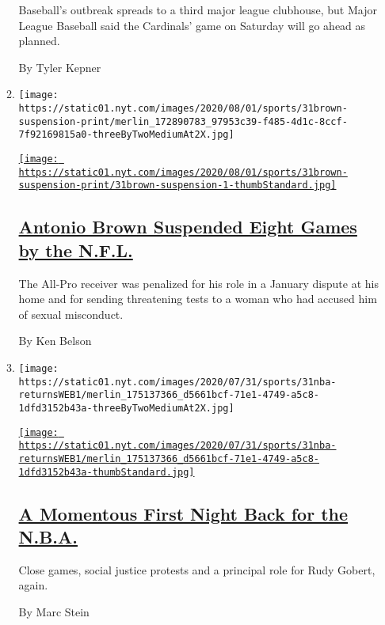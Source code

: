 \begin{enumerate}
\begin{enumerate}
    Baseball's outbreak spreads to a third major league clubhouse, but
    Major League Baseball said the Cardinals' game on Saturday will go
    ahead as planned.

    By Tyler Kepner
  \item
    \texttt{[image: https://static01.nyt.com/images/2020/08/01/sports/31brown-suspension-print/merlin\_172890783\_97953c39-f485-4d1c-8ccf-7f92169815a0-threeByTwoMediumAt2X.jpg]}

    \href{/2020/07/31/sports/football/antonio-brown-suspension-nfl.html}{\texttt{[image: https://static01.nyt.com/images/2020/08/01/sports/31brown-suspension-print/31brown-suspension-1-thumbStandard.jpg]}}

    \hypertarget{antonio-brown-suspended-eight-games-by-the-nfl}{%
    \subsection{\texorpdfstring{\href{/2020/07/31/sports/football/antonio-brown-suspension-nfl.html}{Antonio
    Brown Suspended Eight Games by the
    N.F.L.}}{Antonio Brown Suspended Eight Games by the N.F.L.}}\label{antonio-brown-suspended-eight-games-by-the-nfl}}

    The All-Pro receiver was penalized for his role in a January dispute
    at his home and for sending threatening tests to a woman who had
    accused him of sexual misconduct.

    By Ken Belson
  \item
    \texttt{[image: https://static01.nyt.com/images/2020/07/31/sports/31nba-returnsWEB1/merlin\_175137366\_d5661bcf-71e1-4749-a5c8-1dfd3152b43a-threeByTwoMediumAt2X.jpg]}

    \href{/2020/07/31/sports/basketball/nba-opening-night.html}{\texttt{[image: https://static01.nyt.com/images/2020/07/31/sports/31nba-returnsWEB1/merlin\_175137366\_d5661bcf-71e1-4749-a5c8-1dfd3152b43a-thumbStandard.jpg]}}

    \hypertarget{a-momentous-first-night-back-for-the-nba}{%
    \subsection{\texorpdfstring{\href{/2020/07/31/sports/basketball/nba-opening-night.html}{A
    Momentous First Night Back for the
    N.B.A.}}{A Momentous First Night Back for the N.B.A.}}\label{a-momentous-first-night-back-for-the-nba}}

    Close games, social justice protests and a principal role for Rudy
    Gobert, again.

    By Marc Stein
  \end{enumerate}
\end{enumerate}

